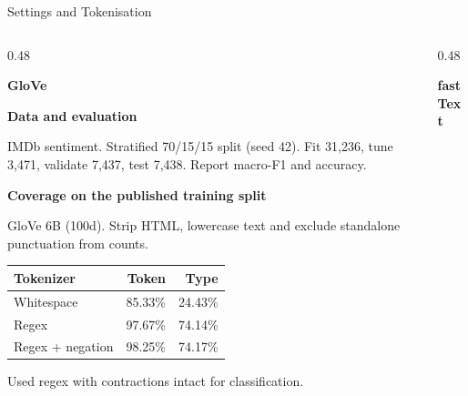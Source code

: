 \begin{frame}[t]{Settings and Tokenisation}
\begin{columns}[T,onlytextwidth]
\begin{column}{0.48\textwidth}
\raggedright\footnotesize
\textbf{GloVe}\par\smallskip
\textbf{Data and evaluation}\par
IMDb sentiment. Stratified 70/15/15 split (seed 42). Fit 31,236, tune 3,471, validate 7,437, test 7,438. Report macro-F1 and accuracy.

\smallskip
\textbf{Coverage on the published training split}\par
GloVe 6B (100d). Strip HTML, lowercase text and exclude standalone punctuation from counts.

\smallskip
{\scriptsize
\begin{tabular*}{\linewidth}{@{\extracolsep{\fill}}lrr@{}}
\hline
Tokenizer & Token & Type \\
\hline
Whitespace & 85.33\% & 24.43\% \\
Regex & 97.67\% & 74.14\% \\
Regex + negation & 98.25\% & 74.17\% \\
\hline
\end{tabular*}\par}

\smallskip
Used regex with contractions intact for classification.
\end{column}
\begin{column}{0.48\textwidth}
\raggedright\footnotesize\textbf{fastText}\par
\end{column}
\end{columns}
\end{frame}

